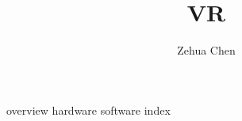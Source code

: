 \documentclass[letterpaper, 11pt]{report}
\title{VR}
\author{Zehua Chen}
\begin{document}
  \maketitle
  \tableofcontents

  {overview}
  {hardware}
  {software}
  {index}
\end{document}
